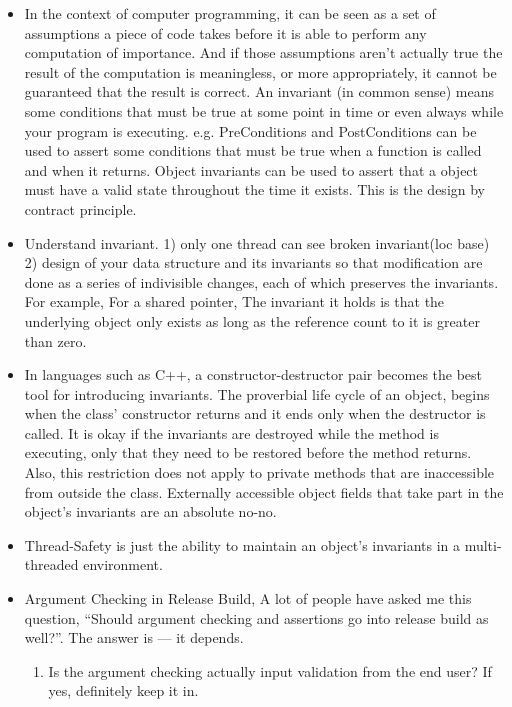 \documentclass[a4paper,11pt,twoside]{book}
\begin{document}
\begin{itemize}
	\item In the context of computer programming, it can be seen as a set of assumptions a piece of code takes before it is able to perform any computation of importance. And if those assumptions aren’t actually true the result of the computation is meaningless, or more appropriately, it cannot be guaranteed that the result is correct. An invariant (in common sense) means some conditions that must be true at some point in time or even always while your program is executing. e.g. PreConditions and PostConditions can be used to assert some conditions that must be true when a function is called and when it returns. Object invariants can be used to assert that a object must have a valid state throughout the time it exists. This is the design by contract principle.
	
	\item Understand invariant. 1) only one thread can see broken invariant(loc base) 2) design of your data structure and its invariants so that modification are done as a series of indivisible changes, each of which preserves the invariants. For example, For a shared pointer, The invariant it holds is that the underlying object only exists as long as the reference count to it is greater than zero.
	
	\item In languages such as C++, a constructor-destructor pair becomes the best tool for introducing invariants. The proverbial life cycle of an object, begins when the class’ constructor returns and it ends only when the destructor is called.  It is okay if the invariants are destroyed while the method is executing, only that they need to be restored before the method returns. Also, this restriction does not apply to private methods that are inaccessible from outside the class. Externally accessible object fields that take part in the object’s invariants are an absolute no-no.
	
	\item Thread-Safety is just the ability to maintain an object’s invariants in a multi-threaded environment.
	
	\item Argument Checking in Release Build, A lot of people have asked me this question, “Should argument checking and assertions go into release build as well?”. The answer is — it depends.
	
	\begin{enumerate}
		\item Is the argument checking actually input validation from the end user? If yes, definitely keep it in.
		

\end{enumerate}
\end{itemize}
\end{document}
